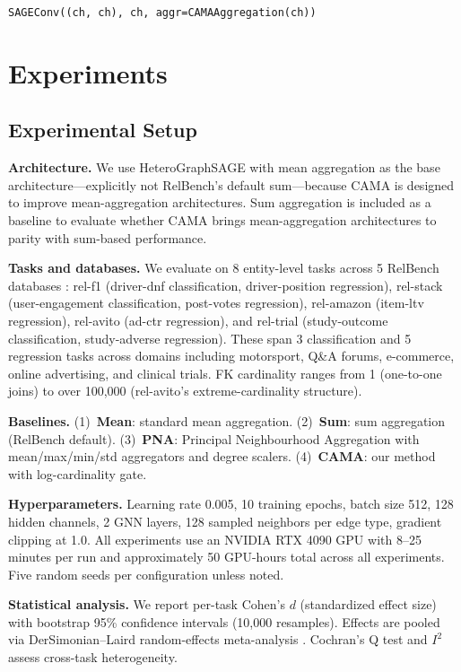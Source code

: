 \documentclass[11pt,letterpaper]{article}
\begin{document}
\smallskip
\noindent\texttt{SAGEConv((ch, ch), ch, aggr=CAMAAggregation(ch))}


\section{Experiments}
\label{sec:experiments}

\subsection{Experimental Setup}
\label{sec:setup}

\textbf{Architecture.} We use HeteroGraphSAGE with mean aggregation as the base architecture---explicitly not RelBench's default sum---because CAMA is designed to improve mean-aggregation architectures. Sum aggregation is included as a baseline to evaluate whether CAMA brings mean-aggregation architectures to parity with sum-based performance.

\textbf{Tasks and databases.} We evaluate on 8 entity-level tasks across 5 RelBench databases \citep{Robinson2024}: rel-f1 (driver-dnf classification, driver-position regression), rel-stack (user-engagement classification, post-votes regression), rel-amazon (item-ltv regression), rel-avito (ad-ctr regression), and rel-trial (study-outcome classification, study-adverse regression). These span 3 classification and 5 regression tasks across domains including motorsport, Q\&A forums, e-commerce, online advertising, and clinical trials. FK cardinality ranges from 1 (one-to-one joins) to over 100,000 (rel-avito's extreme-cardinality structure).

\textbf{Baselines.} (1)~\textbf{Mean}: standard mean aggregation. (2)~\textbf{Sum}: sum aggregation (RelBench default). (3)~\textbf{PNA}: Principal Neighbourhood Aggregation \citep{Corso2020} with mean/max/min/std aggregators and degree scalers. (4)~\textbf{CAMA}: our method with log-cardinality gate.

\textbf{Hyperparameters.} Learning rate 0.005, 10 training epochs, batch size 512, 128 hidden channels, 2 GNN layers, 128 sampled neighbors per edge type, gradient clipping at 1.0. All experiments use an NVIDIA RTX 4090 GPU with 8--25 minutes per run and approximately 50 GPU-hours total across all experiments. Five random seeds per configuration unless noted.

\textbf{Statistical analysis.} We report per-task Cohen's $d$ (standardized effect size) with bootstrap 95\% confidence intervals (10,000 resamples). Effects are pooled via DerSimonian--Laird random-effects meta-analysis \citep{DerSimonian1986}. Cochran's Q test and $I^2$ assess cross-task heterogeneity.
\end{document}
